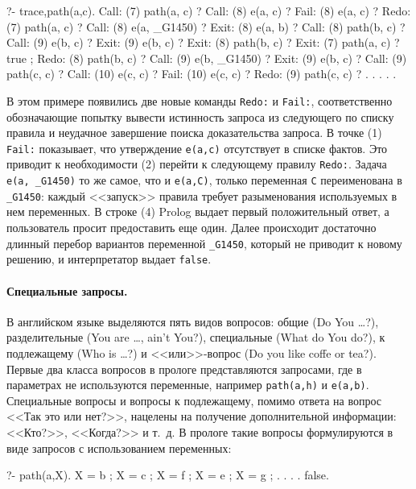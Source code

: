 \documentclass[a4paper,14pt, openany, twoside, draft]{extbook} %
\begin{document}
\begin{proexp}
?- trace,path(a,c).
   Call: (7) path(a, c) ?
   Call: (8) e(a, c) ?
   Fail: (8) e(a, c) ?        %
   Redo: (7) path(a, c) ?     %
   Call: (8) e(a, _G1450) ?   %
   Exit: (8) e(a, b) ?
   Call: (8) path(b, c) ?
   Call: (9) e(b, c) ?
   Exit: (9) e(b, c) ?
   Exit: (8) path(b, c) ?
   Exit: (7) path(a, c) ?
true ;                        %
   Redo: (8) path(b, c) ?
   Call: (9) e(b, _G1450) ?
   Exit: (9) e(b, c) ?
   Call: (9) path(c, c) ?
   Call: (10) e(c, c) ?
   Fail: (10) e(c, c) ?
   Redo: (9) path(c, c) ?     %
   . . . . .
\end{proexp}


В этом примере появились две новые команды \texttt{Redo:} и \texttt{Fail:}, соответственно обозначающие попытку вывести истинность запроса из следующего по списку правила и неудачное завершение поиска доказательства запроса.  В точке (1) \texttt{Fail:} показывает, что утверждение \texttt{e(a,c)} отсутствует в списке фактов.  Это приводит к необходимости (2) перейти к следующему правилу \texttt{Redo:}.  Задача \texttt{e(a, \_G1450)} то же самое, что и \texttt{e(a,C)}, только переменная \texttt{C} переименована в \texttt{\_G1450}: каждый <<запуск>> правила требует разыменования используемых в нем переменных.  В строке (4) Prolog выдает первый положительный ответ, а пользователь просит предоставить еще один.  Далее происходит достаточно длинный перебор вариантов переменной \texttt{\_G1450}, который не приводит к новому решению, и интерпретатор выдает \texttt{false}.

\paragraph{Специальные запросы.} В английском языке выделяются пять видов вопросов: общие (Do You \ldots{}?), разделительные (You are \ldots{}, ain't You?), специальные (What do You do?), к подлежащему (Who is \ldots{}?) и <<или>>-вопрос (Do you like coffe or tea?).  Первые два класса вопросов в прологе представляются запросами, где в параметрах не используются переменные, например \texttt{path(a,h)} и \texttt{e(a,b)}.  Специальные вопросы и вопросы к подлежащему, помимо ответа на вопрос <<Так это или нет?>>, нацелены на получение дополнительной информации: <<Кто?>>, <<Когда?>> и т.~д.  В прологе такие вопросы формулируются в виде запросов с использованием переменных:

\begin{proexp}
?- path(a,X).
X = b ;
X = c ;
X = f ;
X = e ;
X = g ;
. . . .
false.
\end{proexp}
\end{document}
